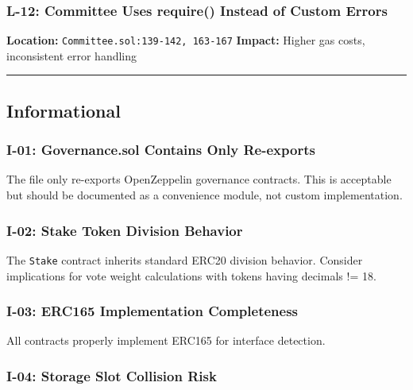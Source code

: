 \documentclass[
]{article}
\begin{document}
\subsubsection{L-12: Committee Uses require() Instead of Custom
Errors}\label{l-12-committee-uses-require-instead-of-custom-errors}

\textbf{Location:} \texttt{Committee.sol:139-142,\ 163-167}
\textbf{Impact:} Higher gas costs, inconsistent error handling

\begin{center}\rule{0.5\linewidth}{0.5pt}\end{center}

\subsection{Informational}\label{informational}

\subsubsection{I-01: Governance.sol Contains Only
Re-exports}\label{i-01-governancesol-contains-only-re-exports}

The file only re-exports OpenZeppelin governance contracts. This is
acceptable but should be documented as a convenience module, not custom
implementation.

\subsubsection{I-02: Stake Token Division
Behavior}\label{i-02-stake-token-division-behavior}

The \texttt{Stake} contract inherits standard ERC20 division behavior.
Consider implications for vote weight calculations with tokens having
decimals != 18.

\subsubsection{I-03: ERC165 Implementation
Completeness}\label{i-03-erc165-implementation-completeness}

All contracts properly implement ERC165 for interface detection.

\subsubsection{I-04: Storage Slot Collision
Risk}\label{i-04-storage-slot-collision-risk}
\end{document}

